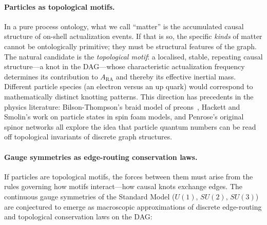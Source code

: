 \documentclass[11pt,a4paper]{article}
\theoremstyle{plain}
\theoremstyle{definition}
\theoremstyle{remark}
\begin{document}
\paragraph{Particles as topological motifs.}
In a pure process ontology, what we call ``matter'' is the accumulated causal
structure of on-shell actualization events. If that is so, the specific
\emph{kinds} of matter cannot be ontologically primitive; they must be structural
features of the graph. The natural candidate is the \emph{topological motif}: a
localised, stable, repeating causal structure---a knot in the DAG---whose
characteristic actualization frequency determines its contribution to $A_{\mathrm{RA}}$
and thereby its effective inertial mass. Different particle species (an electron
versus an up quark) would correspond to mathematically distinct knotting patterns.
This direction has precedents in the physics literature: Bilson-Thompson's braid
model of preons~\citep{BilsonThompson2006}, Hackett and Smolin's work on particle
states in spin foam models, and Penrose's original spinor networks all explore
the idea that particle quantum numbers can be read off topological invariants of
discrete graph structures.

\paragraph{Gauge symmetries as edge-routing conservation laws.}
If particles are topological motifs, the forces between them must arise from the
rules governing how motifs interact---how causal knots exchange edges. The
continuous gauge symmetries of the Standard Model ($U(1)$, $SU(2)$, $SU(3)$)
are conjectured to emerge as macroscopic approximations of discrete edge-routing
and topological conservation laws on the DAG:
\end{document}
